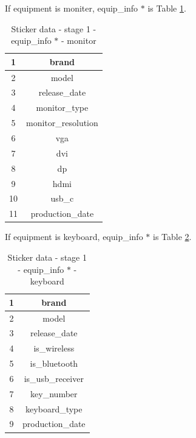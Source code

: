 \documentclass[a4paper,11pt]{article}
\begin{document}
If equipment is moniter, equip\_info $*$ is Table \ref{table:sticker_data_stage_1_equip_info_monitor}.
\begin{table}[h!]
	\begin{center}
		\begin{tabular}{ | c | c | }
			\hline
			1 & brand \\ 
			\hline
			2 & model  \\  
			\hline
			3 & release\_date \\
			\hline
			4 & monitor\_type \\ 
			\hline
			5 &  monitor\_resolution \\  
			\hline
			6 & vga \\
			\hline
			7 &  dvi \\  
			\hline
			8 & dp \\
			\hline
			9 & hdmi \\
			\hline
			10 & usb\_c \\  
			\hline
			11 & production\_date \\
			\hline
		\end{tabular}
		\caption{Sticker data \-- stage 1 \-- equip\_info $*$ \-- monitor}
		\label{table:sticker_data_stage_1_equip_info_monitor}
	\end{center}
\end{table}

If equipment is keyboard, equip\_info $*$ is Table \ref{table:sticker_data_stage_1_equip_info_keyboard}.
\begin{table}[h!]
	\begin{center}
		\begin{tabular}{ | c | c | }
			\hline
			1 & brand \\ 
			\hline
			2 & model  \\  
			\hline
			3 & release\_date \\
			\hline
			4 & is\_wireless \\ 
			\hline
			5 &  is\_bluetooth \\  
			\hline
			6 & is\_usb\_receiver \\
			\hline
			7 &  key\_number \\  
			\hline
			8 & keyboard\_type \\
			\hline
			9 & production\_date \\
			\hline
		\end{tabular}
		\caption{Sticker data \-- stage 1 \-- equip\_info $*$ \-- keyboard}
		\label{table:sticker_data_stage_1_equip_info_keyboard}
	\end{center}
\end{table}
\end{document}
